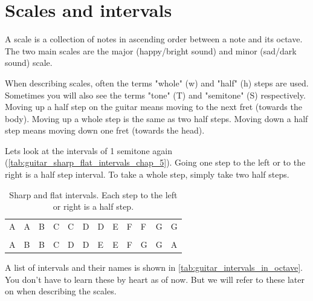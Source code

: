 \newpage

\section{Scales and intervals}

A scale is a collection of notes in ascending order between a note and its octave. The two main scales are the major (happy/bright sound) and minor (sad/dark sound) scale.

When describing scales, often the terms "whole" (w) and "half" (h) steps are used. Sometimes you will also see the terms "tone" (T) and "semitone" (S) respectively. Moving up a half step on the guitar means moving to the next fret (towards the body). Moving up a whole step is the same as two half steps. Moving down a half step means moving down one fret (towards the head).

Lets look at the intervals of 1 semitone again (\autoref{tab:guitar_sharp_flat_intervals_chap_5}). Going one step to the left or to the right is a half step interval. To take a whole step, simply take two half steps.

\begin{table}[h]
	\centering
	\begin{NiceTabular}{*{12}{P{5mm}}}
		\large{A} & \large{A\sharp} & \large{B} & \large{C} & \large{C\sharp} & \large{D} & \large{D\sharp} & \large{E} & \large{F} & \large{F\sharp} & \large{G} & \large{G\sharp} \\ \\
		\large{A} & \large{B\flat} & \large{B} & \large{C} & \large{D\flat} & \large{D} & \large{E\flat} & \large{E} & \large{F} & \large{G\flat}& \large{G} & \large{A\flat}
	\end{NiceTabular}
	\caption{Sharp and flat intervals. Each step to the left or right is a half step.}
	\label{tab:guitar_sharp_flat_intervals_chap_5}
\end{table}

A list of intervals and their names is shown in \autoref{tab:guitar_intervals_in_octave}. You don't have to learn these by heart as of now. But we will refer to these later on when describing the scales.

